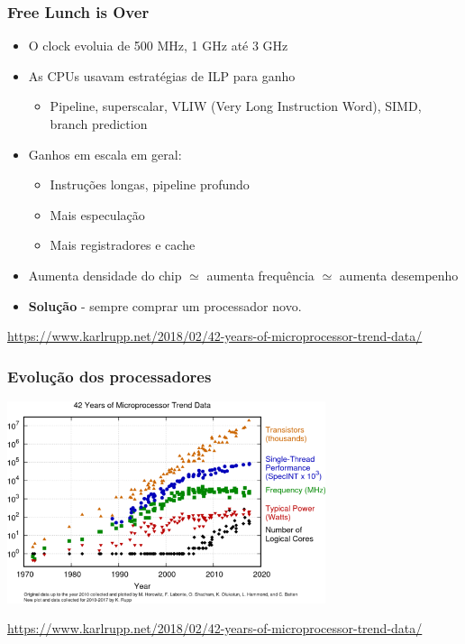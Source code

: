 \documentclass[xcolor={usenames,dvipsnames},12pt,presentation,aspectratio=169]{beamer}
\begin{document}
\begin{frame}
  \frametitle{Free Lunch is Over}
  \begin{itemize}
  \item  O clock evoluia de 500 MHz, 1 GHz até 3 GHz 
  \item As CPUs usavam estratégias de ILP para ganho
    \begin{itemize}
        \item Pipeline, superscalar, VLIW (Very Long Instruction Word), SIMD, branch prediction
    \end{itemize}
    \item Ganhos em escala em geral:
    \begin{itemize}
        \item Instruções longas, pipeline profundo
        \item Mais especulação
        \item Mais registradores e cache
    \end{itemize}
    \item Aumenta densidade do chip $\simeq$ aumenta frequência $\simeq$ aumenta desempenho

    \item \textbf{Solução} - sempre comprar um processador novo.
  \end{itemize}
  {\footnotesize \url{https://www.karlrupp.net/2018/02/42-years-of-microprocessor-trend-data/}}
\end{frame}
\begin{frame}
  \frametitle{Evolução dos processadores}
  \vspace{-4mm}
  \begin{center}
	\includegraphics[width=0.7\textwidth]{42-years-processor-trend-625x396.png}
  \end{center}
  {\footnotesize \url{https://www.karlrupp.net/2018/02/42-years-of-microprocessor-trend-data/}}
\end{frame}
\end{document}
